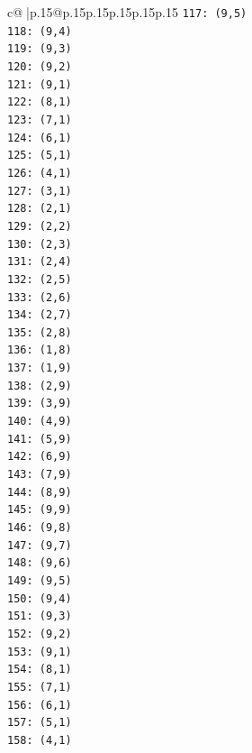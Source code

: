 \documentclass{article}
\begin{document}
{\begin{supertabular}{c@{$\;$}|p{.15\linewidth}@{}p{.15\linewidth}p{.15\linewidth}p{.15\linewidth}p{.15\linewidth}p{.15\linewidth}}
{{{\texttt{117: (9,5)} \\
\texttt{118: (9,4)} \\
\texttt{119: (9,3)} \\
\texttt{120: (9,2)} \\
\texttt{121: (9,1)} \\
\texttt{122: (8,1)} \\
\texttt{123: (7,1)} \\
\texttt{124: (6,1)} \\
\texttt{125: (5,1)} \\
\texttt{126: (4,1)} \\
\texttt{127: (3,1)} \\
\texttt{128: (2,1)} \\
\texttt{129: (2,2)} \\
\texttt{130: (2,3)} \\
\texttt{131: (2,4)} \\
\texttt{132: (2,5)} \\
\texttt{133: (2,6)} \\
\texttt{134: (2,7)} \\
\texttt{135: (2,8)} \\
\texttt{136: (1,8)} \\
\texttt{137: (1,9)} \\
\texttt{138: (2,9)} \\
\texttt{139: (3,9)} \\
\texttt{140: (4,9)} \\
\texttt{141: (5,9)} \\
\texttt{142: (6,9)} \\
\texttt{143: (7,9)} \\
\texttt{144: (8,9)} \\
\texttt{145: (9,9)} \\
\texttt{146: (9,8)} \\
\texttt{147: (9,7)} \\
\texttt{148: (9,6)} \\
\texttt{149: (9,5)} \\
\texttt{150: (9,4)} \\
\texttt{151: (9,3)} \\
\texttt{152: (9,2)} \\
\texttt{153: (9,1)} \\
\texttt{154: (8,1)} \\
\texttt{155: (7,1)} \\
\texttt{156: (6,1)} \\
\texttt{157: (5,1)} \\
\texttt{158: (4,1)} \\
}}}
\end{supertabular}}
\end{document}
